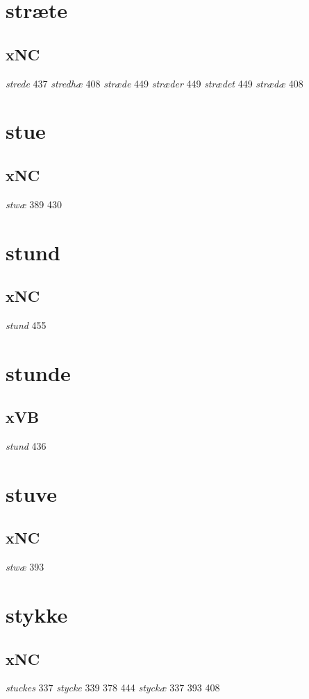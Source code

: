 \documentclass[a4paper,twocolumn]{article}
\begin{document}
\section{stræte}
\label{sec:orgd203df4}
\subsection{xNC}
\label{sec:org25e3415}
\emph{strede} 437 \emph{stredhæ} 408 \emph{stræde} 449 \emph{stræder} 449 \emph{strædet} 449 \emph{strædæ} 408 
\section{stue}
\label{sec:org91d78b2}
\subsection{xNC}
\label{sec:org70d3fd8}
\emph{stwæ} 389 430 
\section{stund}
\label{sec:orgf0f1fea}
\subsection{xNC}
\label{sec:org9c2e4cb}
\emph{stund} 455 
\section{stunde}
\label{sec:orgd66e73c}
\subsection{xVB}
\label{sec:org0581ee2}
\emph{stund} 436 
\section{stuve}
\label{sec:org6165597}
\subsection{xNC}
\label{sec:org67aa97d}
\emph{stwæ} 393 
\section{stykke}
\label{sec:orgd963803}
\subsection{xNC}
\label{sec:org885bd34}
\emph{stuckes} 337 \emph{stycke} 339 378 444 \emph{styckæ} 337 393 408 
\end{document}

